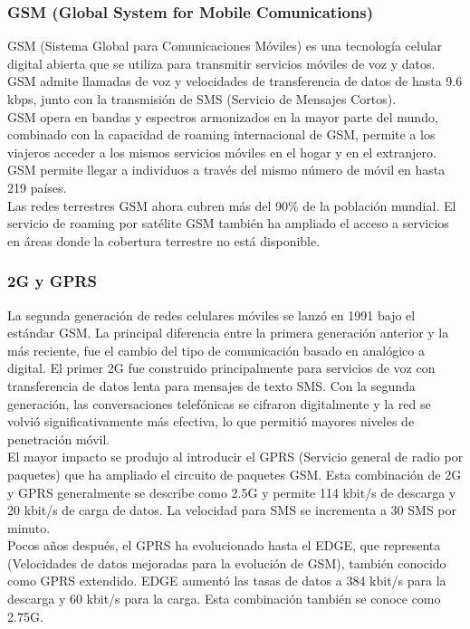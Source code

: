 		\subsubsection{GSM (Global System for Mobile Comunications)}
		GSM (Sistema Global para Comunicaciones Móviles) es una tecnología celular digital abierta que se utiliza para transmitir servicios móviles de voz y datos. GSM admite llamadas de voz y velocidades de transferencia de datos de hasta 9.6 kbps, junto con la transmisión de SMS (Servicio de Mensajes Cortos). \\
		
		GSM opera en bandas y espectros armonizados en la mayor parte del mundo, combinado con la capacidad de roaming internacional de GSM, permite a los viajeros acceder a los mismos servicios móviles en el hogar y en el extranjero. GSM permite llegar a individuos a través del mismo número de móvil en hasta 219 países. \\
		
		Las redes terrestres GSM ahora cubren más del 90\% de la población mundial. El servicio de roaming por satélite GSM también ha ampliado el acceso a servicios en áreas donde la cobertura terrestre no está disponible. \cite{gsm}
		
		\subsubsection{2G y GPRS}
		La segunda generación de redes celulares móviles se lanzó en 1991 bajo el estándar GSM. La principal diferencia entre la primera generación anterior y la más reciente, fue el cambio del tipo de comunicación basado en analógico a digital. El primer 2G fue construido principalmente para servicios de voz con transferencia de datos lenta para mensajes de texto SMS. Con la segunda generación, las conversaciones telefónicas se cifraron digitalmente y la red se volvió significativamente más efectiva, lo que permitió mayores niveles de penetración móvil. \\
		
		El mayor impacto se produjo al introducir el GPRS (Servicio general de radio por paquetes) que ha ampliado el circuito de paquetes GSM. Esta combinación de 2G y GPRS generalmente se describe como 2.5G y permite 114 kbit/s de descarga y 20 kbit/s de carga de datos. La velocidad para SMS se incrementa a 30 SMS por minuto. \\
		
		Pocos años después, el GPRS ha evolucionado hasta el EDGE, que representa (Velocidades de datos mejoradas para la evolución de GSM), también conocido como GPRS extendido. EDGE aumentó las tasas de datos a 384 kbit/s para la descarga y 60 kbit/s para la carga. Esta combinación también se conoce como 2.75G. \cite{2g3g4g}
		
